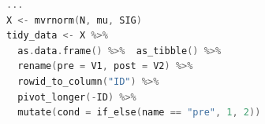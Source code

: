 \begin{lstlisting}[language=c++,label={code:22_04},caption={対応ある二群の仮想データ・整然版}]
...
X <- mvrnorm(N, mu, SIG)
tidy_data <- X %>%
  as.data.frame() %>%  as_tibble() %>%
  rename(pre = V1, post = V2) %>%
  rowid_to_column("ID") %>%
  pivot_longer(-ID) %>%
  mutate(cond = if_else(name == "pre", 1, 2))
\end{lstlisting}

